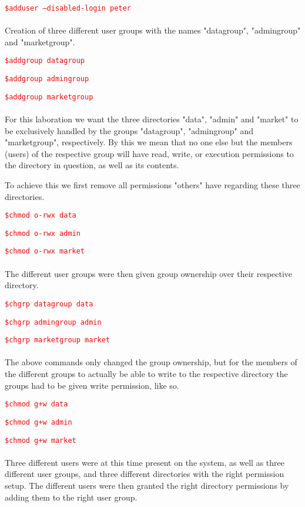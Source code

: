 \documentclass[a4paper,10pt]{article}
\begin{document}
\textcolor{red}{\texttt{\$adduser --disabled-login peter}}
\\
\\
Creation of three different user groups with the names "datagroup", "admingroup" and "marketgroup".

\textcolor{red}{\texttt{\$addgroup datagroup}}

\textcolor{red}{\texttt{\$addgroup admingroup}}

\textcolor{red}{\texttt{\$addgroup marketgroup}}
\\
\\
For this laboration we want the three directories "data", "admin" and "market" to be exclusively handled by the groups "datagroup", "admingroup" and "marketgroup", respectively. By this we mean that no one else but the members (users) of the respective group will have read, write, or execution permissions to the directory in question, as well as its contents. 

To achieve this we first remove all permissions "others" have regarding these three directories.
 
\textcolor{red}{\texttt{\$chmod o-rwx data}}

\textcolor{red}{\texttt{\$chmod o-rwx admin}}

\textcolor{red}{\texttt{\$chmod o-rwx market}}
\\
\\
The different user groups were then given group ownership over their respective directory.

\textcolor{red}{\texttt{\$chgrp datagroup data}}

\textcolor{red}{\texttt{\$chgrp admingroup admin}}

\textcolor{red}{\texttt{\$chgrp marketgroup market}}
\\
\\
The above commands only changed the group ownership, but for the members of the different groups to actually be able to write to the respective directory the groups had to be given write permission, like so.

\textcolor{red}{\texttt{\$chmod g+w data}}

\textcolor{red}{\texttt{\$chmod g+w admin}}

\textcolor{red}{\texttt{\$chmod g+w market}}
\\
\\
Three different users were at this time present on the system, as well as three different user groups, and three different directories with the right permission setup. The different users were then granted the right directory permissions by adding them to the right user group.
\end{document}
